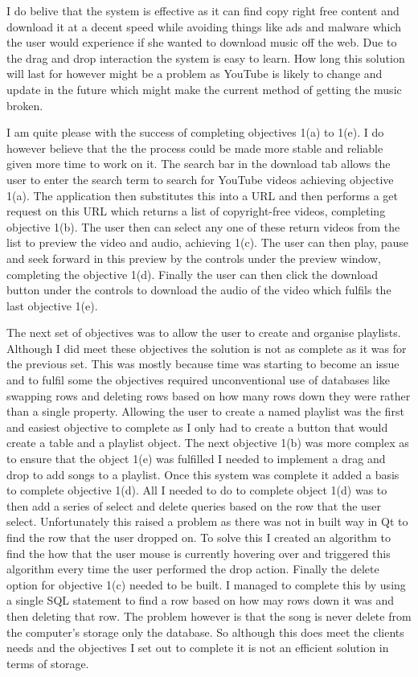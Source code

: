 \documentclass{article}
\begin{document}
I do belive that the system is effective as it can find copy right free content and download it at a decent
speed while avoiding things like ads and malware which the user would experience if she wanted to download
music off the web. Due to the drag and drop interaction the system is easy to learn. How long this solution
will last for however might be a problem as YouTube is likely to change and update in the future which
might make the current method of getting the music broken.

I am quite please with the success of completing objectives 1(a) to 1(e). I do however believe that the
the process could be made more stable and reliable given more time to work on it. The search bar
in the download tab allows the user to enter the search term to search for YouTube videos achieving
objective 1(a). The application then substitutes this into a URL and then performs a get request
on this URL which returns a list of copyright-free videos, completing objective 1(b). The user then
can select any one of these return videos from the list to preview the video and audio, achieving 1(c).
The user can then play, pause and seek forward in this preview by the controls under the preview window,
completing the objective 1(d). Finally the user can then click the download button under the controls to
download the audio of the video which fulfils the last objective 1(e).

The next set of objectives was to allow the user to create and organise playlists. Although I did meet these
objectives the solution is not as complete as it was for the previous set. This was mostly because time was
starting to become an issue and to fulfil some the objectives required unconventional use of databases
like swapping rows and deleting rows based on how many rows down they were rather than a  single property.
Allowing the user to create a named playlist was the first and easiest objective to complete as I only had
to create a button that would create a table and a playlist object. The next objective 1(b) was more complex
as to ensure that the object 1(e) was fulfilled I needed to implement a drag and drop to add songs to a
playlist. Once this system was complete it added a basis to complete objective 1(d). All I needed to do
to complete object 1(d) was to then add a series of select and delete queries based on the row that the
user select. Unfortunately this raised a problem as there was not in built way in Qt to find the row
that the user dropped on. To solve this I created an algorithm to find the how that the user mouse is
currently hovering over and triggered this algorithm every time the user performed the drop action.
Finally the delete option for objective 1(c) needed to be built. I managed to complete this by using a
single SQL statement to find a row based on how may rows down it was and then deleting that row. The
problem however is that the song is never delete from the computer's storage only the database.
So although this does meet the clients needs and the objectives I set out to complete it is not
an efficient solution in terms of storage.
\end{document}

